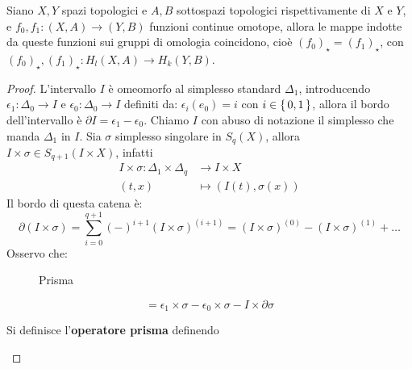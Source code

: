 \begin{theorem}
  Siano $ X, Y $ spazi topologici e $ A, B $ sottospazi topologici rispettivamente
  di $ X $ e $ Y $, e $ f_0, f_1 \colon (X, A) \to (Y, B) $ funzioni continue omotope,
  allora le mappe indotte da queste funzioni sui gruppi di omologia coincidono,
  cioè $ (f_0)_\star = (f_1)_\star $, con $ (f_0)_\star, (f_1)_\star \colon H_l(X,A) \to H_k(Y,B) $.
\end{theorem}
\begin{proof}
  L'intervallo $ I $ è omeomorfo al simplesso standard $ \Delta_1 $, introducendo
  $ \epsilon_1 \colon \Delta_0 \to I $ e $ \epsilon_0 \colon \Delta_0 \to I $ definiti da:
  $ \epsilon_i(e_0) = i $ con $ i \in \set{0,1} $, allora il bordo dell'intervallo è
  $ \partial I = \epsilon_1 - \epsilon_0 $. Chiamo $ I $ con abuso di notazione il simplesso che
  manda $ \Delta_1 $ in $ I $. Sia $ \sigma $ simplesso singolare in $ S_q(X) $, allora
  $ I \times \sigma \in S_{q+1}(I \times X) $, infatti
  \begin{align*}
    I \times \sigma \colon \Delta_1 \times \Delta_q & \to I \times X \\
    (t,x) & \mapsto (I(t), \sigma(x))
  \end{align*}
  Il bordo di questa catena è:
  \[
    \partial (I \times \sigma) = \sum_{i=0}^{q+1} (-)^{i+1}(I \times \sigma)^{(i+1)} = (I \times \sigma)^{(0)} - (I \times \sigma)^{(1)} + \dots
  \]
  Osservo che:
  \begin{figure}[htbp]
    \centering
    \caption{Prisma}
    \label{fig:lez14:prism}
  \end{figure}
  \[
    = \epsilon_1 \times \sigma - \epsilon_0 \times \sigma - I \times \partial \sigma
  \]
  \begin{definition}
    Si definisce l'\textbf{operatore prisma} definendo

\end{definition}
\end{proof}
